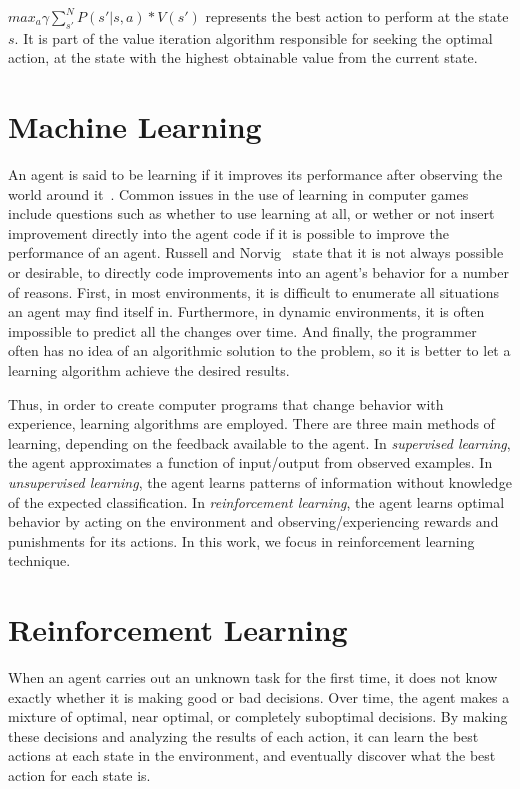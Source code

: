 $max_a \gamma \sum_{s'}^N P(s'|s,a) * V(s')$ represents the best action to perform at the state $s$.
It is part of the value iteration algorithm responsible for seeking the optimal action,
at the state with the highest obtainable value from the current state.



\section{Machine Learning}
\label{sec:machine-learning}

An agent is said to be learning if it improves its performance after observing the world around it~\cite{russell1995artificial}. 
Common issues in the use of learning in computer games include questions such as whether to use learning at all, or wether or not insert improvement directly into the agent code if it is possible to improve the performance of an agent. 
Russell and Norvig~\cite{russell1995artificial} state that it is not always possible or desirable, to directly code improvements into an agent's behavior for a number of reasons. First, in most environments, it is difficult to enumerate all situations an agent may find itself in. Furthermore, in dynamic environments, it is often impossible to predict all the changes over time. And finally, the programmer often has no idea of an algorithmic solution to the problem, so it is better to let a learning algorithm achieve the desired results.

Thus, in order to create computer programs that change behavior with experience, learning algorithms are employed. 
There are three main methods of learning, depending on the feedback available to the agent. 
In \emph{supervised learning}, the agent approximates a function of input/output from observed examples. 
In \emph{unsupervised learning}, the agent learns patterns of information without knowledge of the expected classification. 
In \emph{reinforcement learning}, the agent learns optimal behavior by acting on the environment and observing/experiencing rewards and punishments for its actions. 
In this work, we focus in reinforcement learning technique. 



\section{Reinforcement Learning}
\label{sec:rl}

When an agent carries out an unknown task for the first time, it does not know exactly whether it is making good or bad decisions. 
Over time, the agent makes a mixture of optimal, near optimal, or completely suboptimal decisions. 
By making these decisions and analyzing the results of each action, it can learn the best actions at each state in the environment, and eventually discover what the best action for each state is. 

